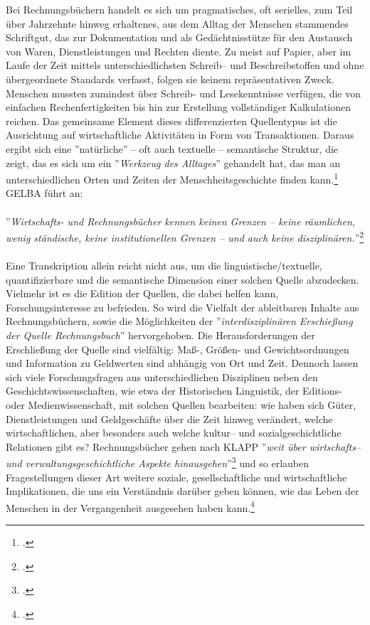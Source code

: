 \documentclass[12pt,a4paper]{article}
\begin{document}
Bei Rechnungsbüchern handelt es sich um pragmatisches, oft serielles, zum Teil über Jahrzehnte hinweg erhaltenes, aus dem Alltag der Menschen stammendes Schriftgut, das zur Dokumentation und als Gedächtnisstütze für den Austausch von Waren, Dienstleistungen und Rechten diente. Zu meist auf Papier, aber im Laufe der Zeit mittels unterschiedlichsten Schreib-- und Beschreibstoffen und ohne übergeordnete Standards verfasst, folgen sie keinem repräsentativen Zweck. Menschen mussten zumindest über Schreib- und Lesekenntnisse verfügen, die von einfachen Rechenfertigkeiten bis hin zur Erstellung vollständiger Kalkulationen reichen. Das gemeinsame Element dieses differenzierten Quellentypus ist die Ausrichtung auf wirtschaftliche Aktivitäten in Form von Transaktionen. Daraus ergibt sich eine ''natürliche'' -- oft auch textuelle -- semantische Struktur, die zeigt, das es sich um ein ''\textit{Werkzeug des Alltages}'' gehandelt hat, das man an unterschiedlichen Orten und Zeiten der Menschheitsgeschichte finden kann.\footcite[][S.2]{tomasekmedea} GELBA führt an:
\\
\\
''\textit{Wirtschafts- und Rechnungsbücher kennen keinen Grenzen -- keine räumlichen, wenig ständische, keine institutionellen Grenzen -- und auch keine disziplinären.}''\footcite[Vgl.][S.51]{gleba2016rechnen}
\\
\\
Eine Transkription allein reicht nicht aus, um die linguistische/textuelle, quantifizierbare und die semantische Dimension einer solchen Quelle abzudecken. Vielmehr ist es die Edition der Quellen, die dabei helfen kann, Forschungsinteresse zu befrieden. So wird die Vielfalt der ableitbaren Inhalte aus Rechnungsbüchern, sowie die Möglichkeiten der ''\textit{interdisziplinären Erschießung der Quelle Rechnungsbuch}'' hervorgehoben. Die Herausforderungen der Erschließung der Quelle sind vielfältig: Maß-, Größen- und Gewichtsordnungen und Information zu Geldwerten sind abhängig von Ort und Zeit. Dennoch lassen sich viele Forschungsfragen aus unterschiedlichen Disziplinen neben den Geschichtswissenschaften, wie etwa der Historischen Linguistik, der Editions- oder Medienwissenschaft, mit solchen Quellen bearbeiten: wie haben sich Güter, Dienstleistungen und Geldgeschäfte über die Zeit hinweg verändert, welche wirtschaftlichen, aber besonders auch welche kultur-- und sozialgeschichtliche Relationen gibt es? Rechnungsbücher gehen nach KLAPP ''\textit{weit über wirtschafts-- und verwaltungsgeschichtliche
Aspekte hinausgehen}''\footcite[][S.14]{klapp2011rechnung} und so erlauben Fragestellungen dieser Art weitere soziale, gesellschaftliche und wirtschaftliche Implikationen, die uns ein Verständnis darüber geben können, wie das Leben der Menschen in der Vergangenheit ausgesehen haben kann.\footcite[][S.7-10]{gleba2015einleitung}
\end{document}

